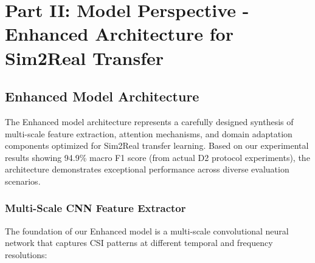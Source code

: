 \documentclass[journal]{IEEEtran}
\begin{document}
\section{Part II: Model Perspective - Enhanced Architecture for Sim2Real Transfer}

\subsection{Enhanced Model Architecture}

The Enhanced model architecture represents a carefully designed synthesis of multi-scale feature extraction, attention mechanisms, and domain adaptation components optimized for Sim2Real transfer learning. Based on our experimental results showing 94.9\% macro F1 score (from actual D2 protocol experiments), the architecture demonstrates exceptional performance across diverse evaluation scenarios.

\subsubsection{Multi-Scale CNN Feature Extractor}

The foundation of our Enhanced model is a multi-scale convolutional neural network that captures CSI patterns at different temporal and frequency resolutions:
\end{document}
